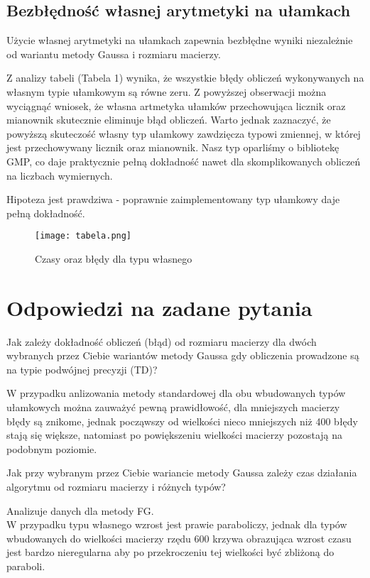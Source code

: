 \documentclass[10pt]{article}
\newenvironment{question}[2][Pytanie]{\begin{trivlist}
\item[\hskip \labelsep {\bfseries #1}\hskip \labelsep {\bfseries #2.}]}{\end{trivlist}}
\newenvironment{hypothesis}[2][Hipoteza]{\begin{trivlist}
\item[\hskip \labelsep {\bfseries #1}\hskip \labelsep {\bfseries #2.}]}{\end{trivlist}}
\newenvironment{corollary}[2][Wniosek]{\begin{trivlist}
\item[\hskip \labelsep {\bfseries #1}\hskip \labelsep {\bfseries #2.}]}{\end{trivlist}}
\begin{document}
\subsection{Bezbłędność własnej arytmetyki na ułamkach}
\begin{hypothesis}{3}
Użycie własnej arytmetyki na ułamkach zapewnia bezbłędne wyniki niezależnie od wariantu metody Gaussa i rozmiaru macierzy.
\end{hypothesis}
Z analizy tabeli (Tabela 1) wynika, że wszystkie błędy obliczeń wykonywanych na własnym typie ułamkowym są równe zeru. Z powyższej obserwacji można wyciągnąć wniosek, że własna artmetyka ułamków przechowująca licznik oraz mianownik skutecznie eliminuje błąd obliczeń. Warto jednak zaznaczyć, że powyższą skuteczość własny typ ułamkowy zawdzięcza typowi zmiennej, w której jest przechowywany licznik oraz mianownik. Nasz typ oparliśmy o bibliotekę GMP, co daje praktycznie pełną dokładność nawet dla skomplikowanych obliczeń na liczbach wymiernych.
\begin{corollary}{3}
Hipoteza jest prawdziwa - poprawnie zaimplementowany typ ułamkowy daje pełną dokładność.
\end{corollary}

\begin{figure}[!htb]
\centering
\texttt{[image: tabela.png]}\\
\caption{Czasy oraz błędy dla typu własnego}\label{Fig:Data2}
\end{figure}


\section {Odpowiedzi na zadane pytania}
\begin{question}{1}
Jak zależy dokładność obliczeń (błąd) od rozmiaru macierzy dla dwóch wybranych przez Ciebie wariantów metody Gaussa gdy obliczenia prowadzone są na typie podwójnej precyzji (TD)?
\end{question}
W przypadku anlizowania metody standardowej dla obu wbudowanych typów ułamkowych można zauważyć pewną prawidłowość, dla mniejszych macierzy błędy są znikome, jednak począwszy od wielkości nieco mniejszych niż 400 błędy stają się większe, natomiast po powiększeniu wielkości macierzy pozostają na podobnym poziomie.

\begin{question}{2}
Jak przy wybranym przez Ciebie wariancie metody Gaussa zależy czas działania algorytmu od rozmiaru macierzy i różnych typów?
\end{question}
Analizuje danych dla metody FG.\\
W przypadku typu własnego wzrost jest prawie paraboliczy, jednak dla typów wbudowanych do wielkości macierzy rzędu 600 krzywa obrazująca wzrost czasu jest bardzo nieregularna aby po przekroczeniu tej wielkości być zbliżoną do paraboli. 
\end{document}
